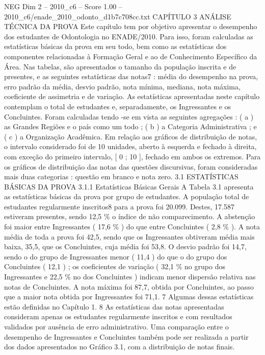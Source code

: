\begin{textsample}{NEG Dim 2 – 2010\_c6 – Score 1.00 – 2010\_c6/enade\_2010\_odonto\_d1b7c708cc.txt}  \label{ex:f2_neg_251}
CAPÍTULO 3 ANÁLISE TÉCNICA DA PROVA Este capítulo tem por objetivo apresentar o desempenho dos estudantes de Odontologia no ENADE/2010.
Para isso, foram calculadas as estatísticas básicas da prova em seu todo, bem como as estatísticas dos componentes relacionadas à Formação Geral e ao de Conhecimento Específico da Área.
Nas tabelas, são apresentados o tamanho da população inscrita e de presentes, e as seguintes estatísticas das notas7 : média do desempenho na prova, erro padrão da média, desvio padrão, nota mínima, mediana, nota máxima, coeficiente de assimetria e de variação.
As estatísticas apresentadas neste capítulo contemplam o total de estudantes e, separadamente, os Ingressantes e os Concluintes.
Foram calculadas tendo -se em vista as seguintes agregações : ( a ) as Grandes Regiões e o país como um todo ; ( b ) a Categoria Administrativa ; e ( c ) a Organização Acadêmica.
Em relação aos gráficos de distribuição de notas, o intervalo considerado foi de 10 unidades, aberto à esquerda e fechado à direita, com exceção do primeiro intervalo, [ 0 ; 10 ], fechado em ambos os extremos.
Para os gráficos de distribuição das notas das questões discursivas, foram consideradas mais duas categorias : questão em branco e nota zero. 3.1 ESTATÍSTICAS BÁSICAS DA PROVA 3.1.1 Estatísticas Básicas Gerais A Tabela 3.1 apresenta as estatísticas básicas da prova por grupo de estudantes.
A população total de estudantes regularmente inscritos8 para a prova foi 20.099.
Destes, 17.587 estiveram presentes, sendo 12,5 \% o índice de não comparecimento.
A abstenção foi maior entre Ingressantes ( 17,6 \% ) do que entre Concluintes ( 2,8 \% ).
A nota média de toda a prova foi 42,5, sendo que os Ingressantes obtiveram média mais baixa, 35,5, que os Concluintes, cuja média foi 53,8.
O desvio padrão foi 14,7, sendo o do grupo de Ingressantes menor ( 11,4 ) do que o do grupo dos Concluintes ( 12,1 ) ; os coeficientes de variação ( 32,1 \% no grupo dos Ingressantes e 22,5 \% no dos Concluintes ) indicam menor dispersão relativa nas notas de Concluintes.
A nota máxima foi 87,7, obtida por Concluintes, ao passo que a maior nota obtida por Ingressantes foi 71,1. 7 Algumas dessas estatísticas estão definidas no Capítulo 1. 8 As estatísticas das notas apresentadas consideram apenas os estudantes regularmente inscritos e com resultados validados por ausência de erro administrativo.
Uma comparação entre o desempenho de Ingressantes e Concluintes também pode ser realizada a partir dos dados apresentados no Gráfico 3.1, com a distribuição de notas finais.

\end{textsample}
